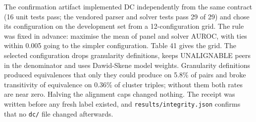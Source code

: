 \documentclass[11pt,letterpaper]{article}
\begin{document}
The confirmation artifact implemented DC independently from the same contract (16 unit tests pass; the vendored parser and solver tests pass 29 of 29) and chose its configuration on the development set from a 12-configuration grid. The rule was fixed in advance: maximise the mean of panel and solver AUROC, with ties within 0.005 going to the simpler configuration. Table 41 gives the grid. The selected configuration drops granularity definitions, keeps UNALIGNABLE peers in the denominator and uses Dawid-Skene model weights. Granularity definitions produced equivalences that only they could produce on 5.8\% of pairs and broke transitivity of equivalence on 0.36\% of cluster triples; without them both rates are near zero. Halving the alignment caps changed nothing. The receipt was written before any fresh label existed, and \texttt{results/\allowbreak{}integrity.json} confirms that no \texttt{dc/\allowbreak{}} file changed afterwards.
\end{document}
